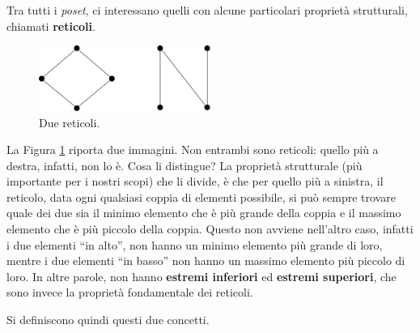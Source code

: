 Tra tutti i \textit{poset}, ci interessano quelli con alcune particolari proprietà 
strutturali, chiamati \textbf{reticoli}. 

\begin{figure}[!h]
  \centering 
  \includegraphics[width=0.5\textwidth]{images/reticolo.png}
  \caption{Due reticoli.}
  \label{figure:reticolo}
\end{figure}


La Figura \ref{figure:reticolo} riporta due immagini. 
Non entrambi sono reticoli: quello più a destra, infatti, non lo è. 
Cosa li distingue? La proprietà strutturale (più importante per i nostri 
scopi) che li divide, è che per quello più a sinistra, il reticolo, data 
ogni qualsiasi coppia di elementi possibile, si può sempre trovare 
quale dei due sia il minimo elemento che è più grande della coppia e il 
massimo elemento che è più piccolo della coppia. Questo non avviene nell'altro 
caso, infatti i due elementi ``in alto'', non hanno un minimo elemento 
più grande di loro, mentre i due elementi ``in basso'' non hanno un massimo 
elemento più piccolo di loro. In altre parole, non hanno 
\textbf{estremi inferiori} ed \textbf{estremi superiori}, che sono 
invece la proprietà fondamentale dei reticoli. 

Si definiscono quindi questi due concetti. 

